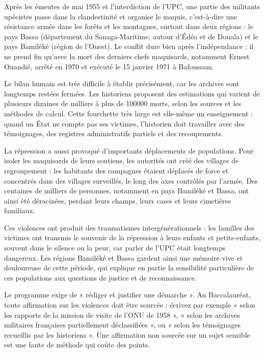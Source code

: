 \documentclass[11pt]{article}
\newcommand{\cle}[1]{{\popxbold\color{popdark}#1}}
\begin{document}
Après les émeutes de mai 1955 et l'interdiction de l'UPC, une partie des militants upécistes passe dans la clandestinité et organise le \cle{maquis}, c'est-à-dire une résistance armée dans les forêts et les montagnes, surtout dans deux régions : le \cle{pays Bassa} (département du Sanaga-Maritime, autour d'Édéa et de Douala) et le \cle{pays Bamiléké} (région de l'Ouest). Le conflit dure bien après l'indépendance : il ne prend fin qu'avec la mort des derniers chefs maquisards, notamment Ernest Ouandié, arrêté en 1970 et exécuté le 15 janvier 1971 à Bafoussam.

Le bilan humain est très difficile à établir précisément, car les archives sont longtemps restées fermées. Les historiens proposent des estimations qui varient de plusieurs dizaines de milliers à plus de \num{100000} morts, selon les sources et les méthodes de calcul. Cette fourchette très large est elle-même un enseignement : quand un État ne compte pas ses victimes, l'historien doit travailler avec des témoignages, des registres administratifs partiels et des recoupements.

La répression a aussi provoqué d'importants \cle{déplacements de populations}. Pour isoler les maquisards de leurs soutiens, les autorités ont créé des \cle{villages de regroupement} : les habitants des campagnes étaient déplacés de force et concentrés dans des villages surveillés, le long des axes contrôlés par l'armée. Des centaines de milliers de personnes, notamment en pays Bamiléké et Bassa, ont ainsi été déracinées, perdant leurs champs, leurs cases et leurs cimetières familiaux.

Ces violences ont produit des \cle{traumatismes intergénérationnels} : les familles des victimes ont transmis le souvenir de la répression à leurs enfants et petits-enfants, souvent dans le silence ou la peur, car parler de l'UPC était longtemps dangereux. Les régions Bamiléké et Bassa gardent ainsi une mémoire vive et douloureuse de cette période, qui explique en partie la sensibilité particulière de ces populations aux questions de justice et de reconnaissance.

\begin{attention}
Le programme exige de « rédiger et justifier une démarche ». Au Baccalauréat, toute affirmation sur les violences doit être \cle{sourcée} : écrivez par exemple « selon les rapports de la mission de visite de l'ONU de 1958 », « selon les archives militaires françaises partiellement déclassifiées », ou « selon les témoignages recueillis par les historiens ». Une affirmation non sourcée sur un sujet sensible est une faute de méthode qui coûte des points.
\end{attention}
\end{document}
